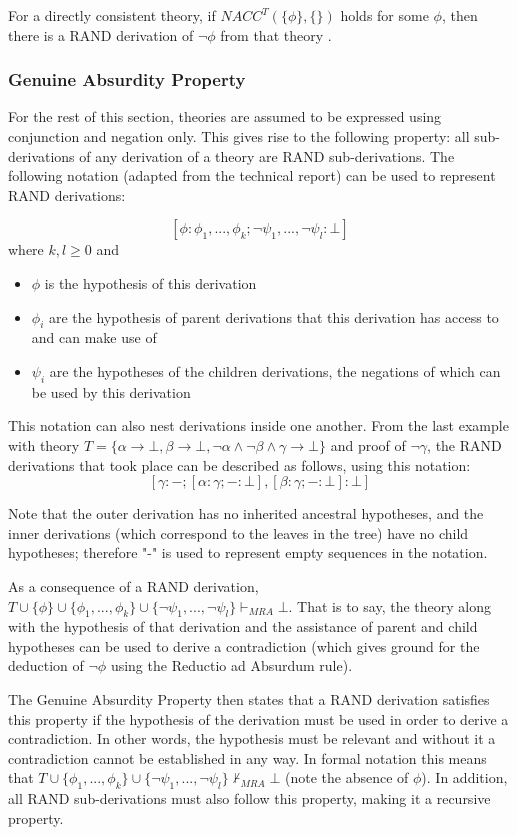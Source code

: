 \documentclass[11pt,twoside,a4paper]{report}
\begin{document}
For a directly consistent theory, if $NACC^T(\{\phi\},\{\})$ holds for some $\phi$, then there is a RAND derivation of $\neg\phi$ from that theory \citep*[p. 18]{alpaper}.

\subsubsection{Genuine Absurdity Property}
\label{subsec:gap}
For the rest of this section, theories are assumed to be expressed using conjunction and negation only. This gives rise to the following property: all sub-derivations of any derivation of a theory are RAND sub-derivations. The following notation (adapted from the technical report) can be used to represent RAND derivations:

\[[\phi:\phi_1, ..., \phi_k; \neg\psi_1, ..., \neg\psi_l: \bot]\]
where $k, l \geq 0$ and
\begin{itemize}
\item
$\phi$ is the hypothesis of this derivation
\item
$\phi_i$ are the hypothesis of parent derivations that this derivation has access to and can make use of
\item
$\psi_i$ are the hypotheses of the children derivations, the negations of which can be used by this derivation
\end{itemize}

This notation can also nest derivations inside one another. From the last example with theory $T = \{\alpha\rightarrow\bot, \beta\rightarrow\bot, \neg\alpha\wedge\neg\beta\wedge\gamma\rightarrow\bot\}$ and proof of $\neg\gamma$, the RAND derivations that took place can be described as follows, using this notation:
\[[\gamma:-;[\alpha:\gamma;-:\bot],[\beta:\gamma;-:\bot]:\bot]\]

Note that the outer derivation has no inherited ancestral hypotheses, and the inner derivations (which correspond to the leaves in the tree) have no child hypotheses; therefore "-" is used to represent empty sequences in the notation.

As a consequence of a RAND derivation, $T\cup\{\phi\}\cup\{\phi_1, ..., \phi_k\}\cup\{\neg\psi_1, ..., \neg\psi_l\}\vdash_{MRA}\bot$. That is to say, the theory along with the hypothesis of that derivation and the assistance of parent and child hypotheses can be used to derive a contradiction (which gives ground for the deduction of $\neg\phi$ using the Reductio ad Absurdum rule). 

The Genuine Absurdity Property then states that a RAND derivation satisfies this property if the hypothesis of the derivation must be used in order to derive a contradiction. In other words, the hypothesis must be relevant and without it a contradiction cannot be established in any way. In formal notation this means that $T\cup\{\phi_1, ..., \phi_k\}\cup\{\neg\psi_1, ..., \neg\psi_l\}\nvdash_{MRA}\bot$ (note the absence of $\phi$). In addition, all RAND sub-derivations must also follow this property, making it a recursive property.
\end{document}

